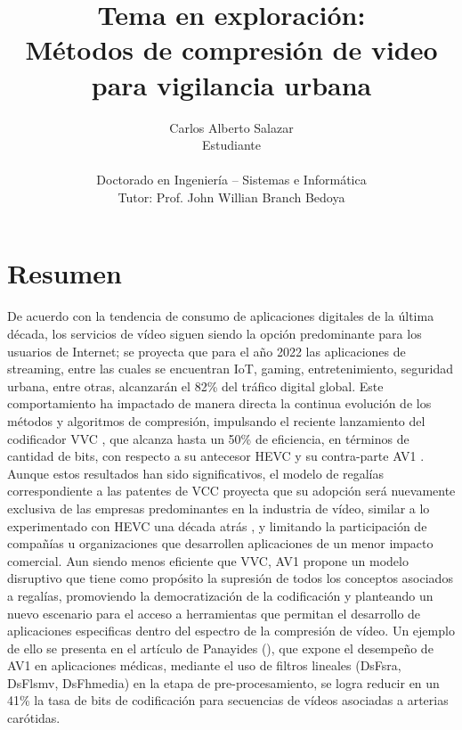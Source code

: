 \documentclass{article}
\title{Tema en exploración:\\
Métodos de compresión de video para vigilancia urbana}
\author{Carlos Alberto Salazar\\
Estudiante\\
\\Doctorado en Ingeniería – Sistemas e Informática
\\Tutor: Prof. John Willian Branch Bedoya}
\begin{document}
\maketitle

\section{Resumen}


De acuerdo con la tendencia de consumo de aplicaciones digitales de la última década, los servicios de vídeo siguen siendo la opción predominante para los usuarios de Internet; se proyecta que para el año 2022 \citep{cisco_report} las aplicaciones de streaming, entre las cuales se encuentran IoT, gaming, entretenimiento, seguridad urbana, entre otras, alcanzarán el 82\% del tráfico digital global. Este comportamiento ha impactado de manera directa la continua evolución de los métodos y algoritmos de compresión, impulsando el reciente lanzamiento del codificador VVC \citep{bross2018versatile}, que alcanza hasta un 50\% de eficiencia, en términos de cantidad de bits,  con respecto a su antecesor HEVC \citep{sullivan2012overview} y su contra-parte AV1 \citep{8456249}. \\

Aunque estos resultados han sido significativos, el modelo de regalías correspondiente a las patentes de VCC \citep{cpan_global} proyecta que su adopción será nuevamente exclusiva de las empresas predominantes en la industria de vídeo, similar a lo experimentado con HEVC una década atrás \citep{battle}, y limitando la participación de compañías u organizaciones que desarrollen aplicaciones de un menor impacto comercial. Aun siendo menos eficiente que VVC, AV1 propone un modelo disruptivo  que tiene como propósito la supresión de todos los conceptos asociados a regalías, promoviendo  la  democratización de la codificación y planteando un nuevo escenario para el acceso a herramientas que permitan el desarrollo de aplicaciones especificas dentro del espectro de la compresión de vídeo. Un ejemplo de ello se presenta en el artículo de Panayides (\citeyear{8954732}), que expone el desempeño de AV1 en aplicaciones médicas, mediante el uso de filtros lineales (DsFsra, DsFlsmv, DsFhmedia) en la etapa de pre-procesamiento, se logra reducir en un 41\% la tasa de bits de codificación para secuencias de vídeos asociadas a arterias carótidas.\\
\end{document}

